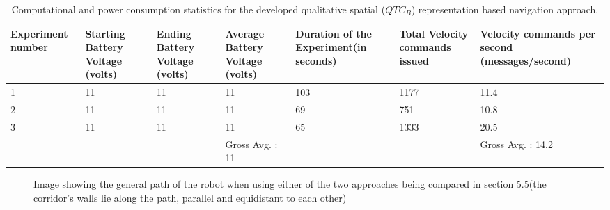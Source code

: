 \begin{table}[h!]
	\begin{adjustwidth}{-1cm}{}
	\begin{tabular}{|p{2cm}|p{2cm}|p{2cm}|p{2.5cm}|p{2cm}|p{2cm}|p{2.5cm}|}
		\hline
		Experiment number & Starting Battery Voltage (volts) & Ending Battery Voltage (volts) & Average Battery Voltage (volts) & Duration of the Experiment(in seconds) & Total Velocity commands issued & Velocity commands per second (messages/second) \\ \hline
		1 & 11 & 11 & 11 & 103 & 1177 & 11.4 \\ \hline
		2 & 11 & 11 & 11 & 69 & 751 & 10.8 \\ \hline
		3 & 11 & 11 & 11 & 65 & 1333 & 20.5 \\ \hline
		&  &  & Gross Avg. : 11 &  &  & Gross Avg. : 14.2 \\ \hline
	\end{tabular}
	\caption{Computational and power consumption statistics for the developed qualitative spatial ($QTC_B$) representation based navigation approach.}
	\label{qualitative table}
\end{adjustwidth}
\end{table}
\newpage
\begin{figure}[H]
	\qquad
	\caption{Image showing the general path of the robot when using either of the two approaches being compared in section 5.5(the corridor's walls lie along the path, parallel and equidistant to each other)}%
	\label{fig:path}%
\end{figure}

